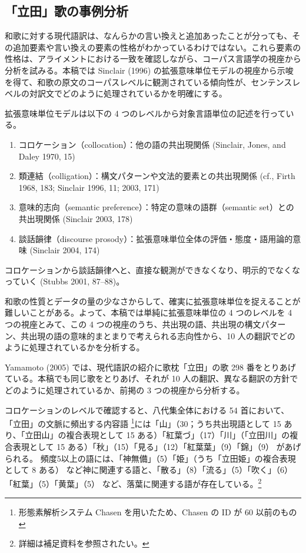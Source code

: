 \documentclass[
  letterpaper,
  DIV=11,
  numbers=noendperiod]{scrartcl}
\providecommand{\tightlist}{%
  \setlength{\itemsep}{0pt}\setlength{\parskip}{0pt}}\usepackage{longtable,booktabs,array}
\begin{document}
\subsection{「立田」歌の事例分析}\label{ux7acbux7530ux6b4cux306eux4e8bux4f8bux5206ux6790}

和歌に対する現代語訳は、なんらかの言い換えと追加あったことが分っても、その追加要素や言い換えの要素の性格がわかっているわけではない。これら要素の性格は、アライメントにおける一致を確認しながら、コーパス言語学の視座から分析を試みる。本稿では
Sinclair (1996)
の拡張意味単位モデルの視座から示唆を得て、和歌の原文のコーパスレベルに観測されている傾向性が、センテンスレベルの対訳文でどのように処理されているかを明確にする。

拡張意味単位モデルは以下の 4
つのレベルから対象言語単位の記述を行っている。

\begin{enumerate}
\def\labelenumi{\arabic{enumi}.}
\tightlist
\item
  コロケーション（collocation）：他の語の共出現関係 (Sinclair, Jones,
  and Daley 1970, 15)
\item
  類連結（colligation）：構文パターンや文法的要素との共出現関係 (cf.,
  Firth 1968, 183; Sinclair 1996, 11; 2003, 171)
\item
  意味的志向（semantic preference）：特定の意味の語群（semantic
  set）との共出現関係 (Sinclair 2003, 178)
\item
  談話韻律（discourse
  prosody）：拡張意味単位全体の評価・態度・語用論的意味 (Sinclair 2004,
  174)
\end{enumerate}

コロケーションから談話韻律へと、直接な観測ができなくなり、明示的でなくなっていく
(Stubbs 2001, 87--88)。

和歌の性質とデータの量の少なさからして、確実に拡張意味単位を捉えることが難しいことがある。よって、本稿では単純に拡張意味単位の
4 つのレベルを 4 つの視座とみて、この 4
つの視座のうち、共出現の語、共出現の構文パターン、共出現の語の意味的まとまりで考えられる志向性から、10
人の翻訳でどのように処理されているかを分析する。

Yamamoto (2005) では、現代語訳の紹介に歌枕「立田」の歌 298
番をとりあげている。本稿でも同じ歌をとりあげ、それが 10
人の翻訳、異なる翻訳の方針でどのように処理されているか、前掲の 3
つの視座から分析する。

コロケーションのレベルで確認すると、八代集全体における 54 首において、
「立田」の文脈に頻出する内容語
\footnote{形態素解析システム Chasen を用いたため、Chasen の ID が 60
  以前のもの}には「山」（30；うち共出現語として 15
あり、「立田山」の複合表現として 15
ある）「紅葉づ」（17）「川」（「立田川」の複合表現として 15
ある）「秋」（15）「見る」（12）「紅葉葉」（9）「錦」（9）
があげられる。
頻度5以上の語には、「神無備」（5）「姫」（うち「立田姫」の複合表現として
8 ある）
など神に関連する語と、「散る」（8）「流る」（5）「吹く」（6）「紅葉」（5）「黄葉」（5）
など、落葉に関連する語が存在している。\footnote{詳細は補足資料を参照されたい。}
\end{document}
